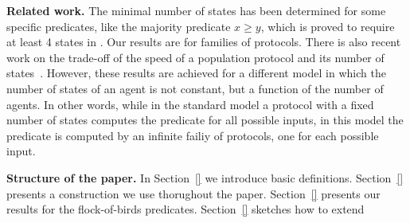 \medskip\noindent \textbf{Related work.} The minimal number of states
has been determined for some specific predicates, like the majority
predicate $x \geq y$, which is proved to require at least 4 states in
\cite{}.  Our results are for families of protocols. There is also
recent work on the trade-off of the speed of a population protocol and
its number of states~\cite{AAEGR17}. However, these results are
achieved for a different model in which the number of states of an
agent is not constant, but a function of the number of agents. In
other words, while in the standard model a protocol with a fixed
number of states computes the predicate for all possible inputs, in
this model the predicate is computed by an infinite failiy of
protocols, one for each possible input.


\medskip\noindent \textbf{Structure of the paper.} In Section~\ref{}
we introduce basic definitions. Section~\ref{} presents a construction
we use thorughout the paper. Section~\ref{} presents our results for
the flock-of-birds predicates. Section~\ref{} sketches how to extend

